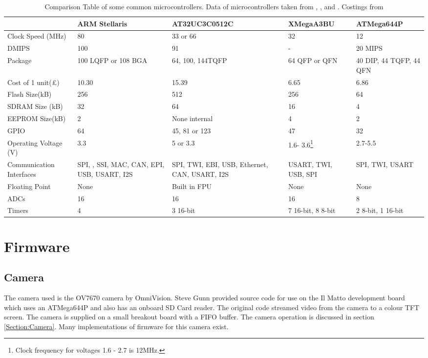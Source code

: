 \begin{table}
\centering
\begin{tabular}{|p{3.5cm}|p{2.4cm}|p{2.9cm}|p{2.3cm}|p{2.4cm}|}\hline
						& 	ARM Stellaris		&	AT32UC3C0512C 		&	XMegaA3BU	&	ATMega644P 	\\	\hline
Clock Speed	(MHz)		&	80					&	33 or 66			&	32			&	12			\\
DMIPS					&	100					&	91					&	-			&	20 MIPS		\\
Package					&	100 LQFP or 108 BGA	&	64, 100, 144TQFP	&	64 QFP or QFN & 40 DIP, 44 TQFP, 44 QFN \\
Cost of 1 unit(\pounds)	&	10.30				& 15.39 &	6.65	 & 6.86\\
Flash Size(kB)			&	256					&	512					&	256			&	64 \\
SDRAM Size (kB)			&	32					&	64					&	16			&	4	\\
EEPROM Size(kB)			&	2					&	None internal		&	4			&	2 	\\
GPIO					&	64					& 	45, 81 or 123		&	47			& 	32	\\
Operating Voltage (V)	&	3.3					& 	5	or 3.3			& 	1.6- 3.6\footnote{Clock frequency for voltages 1.6 - 2.7 is 12MHz.}		& 	2.7-5.5	\\
Communication Interfaces &	SPI, \itc, SSI, MAC, CAN, EPI, USB, USART, I2S	& SPI, TWI, EBI, USB, Ethernet, CAN, USART, I2S	&	USART, TWI, USB, SPI 		&	SPI, TWI, USART \\
Floating Point			&	None				&	Built in FPU		&	None		&	None		\\
ADCs					&	16					&	16					&	16			&	8			\\
Timers					&	4					&	3 16-bit			& 7 16-bit, 8 8-bit & 2 8-bit, 1 16-bit \\
\hline
\end{tabular}
\caption{Comparison Table of some common microcontrollers. Data of microcontrollers taken from \cite{Atmel:UC3C}, \cite{Atmel:644P}, \cite{Atmel:A3BU} and \cite{ARM:Stellaris}. Costings from \cite{Farnell}}
\label{tab:uCComp}
\end{table}

\section{Firmware}
\subsection{Camera}

The camera used is the OV7670 camera by OmniVision. Steve Gunn provided source code for use on the Il Matto development board which uses an ATMega644P and also has an onboard SD Card reader. The original code streamed video from the camera to a colour TFT screen. The camera is supplied on a small breakout board with a FIFO buffer. The camera operation is discussed in section \ref{Section:Camera}. Many implementations of firmware for this camera exist.

